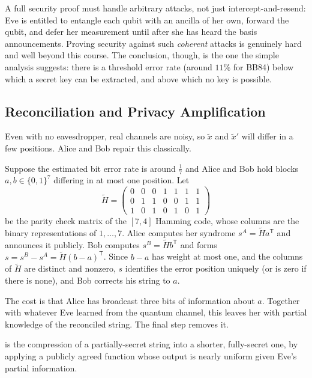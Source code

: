 \begin{remark}
	A full security proof must handle arbitrary attacks, not just intercept-and-resend: Eve is entitled to entangle each qubit with an ancilla of her own, forward the qubit, and defer her measurement until after she has heard the basis announcements. Proving security against such \emph{coherent} attacks is genuinely hard and well beyond this course. The conclusion, though, is the one the simple analysis suggests: there is a threshold error rate (around $11\%$ for BB84) below which a secret key can be extracted, and above which no key is possible.
\end{remark}

\subsection{Reconciliation and Privacy Amplification}

Even with no eavesdropper, real channels are noisy, so $\widetilde x$ and $\widetilde x'$ will differ in a few positions. Alice and Bob repair this classically.

\begin{example}
	Suppose the estimated bit error rate is around $\tfrac17$ and Alice and Bob hold blocks $a, b \in \{0,1\}^7$ differing in at most one position. Let
	$$\widetilde H = \begin{pmatrix} 0&0&0&1&1&1&1\\0&1&1&0&0&1&1\\1&0&1&0&1&0&1\end{pmatrix}$$
	be the parity check matrix of the $[7,4]$ Hamming code, whose columns are the binary representations of $1,\dots,7$. Alice computes her syndrome $s^A = \widetilde H a^{\mathsf T}$ and announces it publicly. Bob computes $s^B = \widetilde Hb^{\mathsf T}$ and forms $s = s^B - s^A = \widetilde H(b-a)^{\mathsf T}$. Since $b - a$ has weight at most one, and the columns of $\widetilde H$ are distinct and nonzero, $s$ identifies the error position uniquely (or is zero if there is none), and Bob corrects his string to $a$.
\end{example}

The cost is that Alice has broadcast three bits of information about $a$. Together with whatever Eve learned from the quantum channel, this leaves her with partial knowledge of the reconciled string. The final step removes it.

\begin{definition}
	 is the compression of a partially-secret string into a shorter, fully-secret one, by applying a publicly agreed function whose output is nearly uniform given Eve's partial information.
\end{definition}

